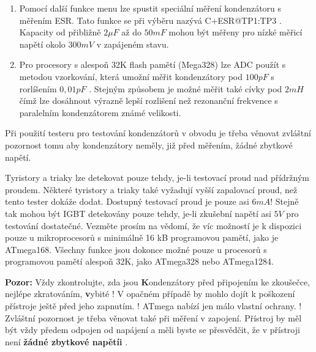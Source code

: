 \begin{enumerate}
\item Pomocí další funkce menu lze spustit speciální měření kondenzátoru s měřením ESR.
Tato funkce se při výběru nazývá \mbox{C+ESR@TP1:TP3} .
 Kapacity od přibližně \(2\mu F\) až do \(50mF\) mohou být měřeny pro nízké měřicí napětí okolo \(300mV\)
 v zapájeném stavu.
\item Pro procesory s alespoň 32K flash pamětí (Mega328) lze ADC použít s metodou vzorkování,
která umožní měřit kondenzátory pod \(100pF\) s rorlíšením  \(0,01pF\) .
Stejným způsobem je možné měřit také cívky pod \(2mH\) čímž lze dosáhnout výrazně lepší rozlišení
než rezonanční frekvence s paralelním kondenzátorem známé velikosti.
\end{enumerate}

 Při použití testeru pro testování kondenzátorů v obvodu je třeba věnovat zvláštní pozornost tomu
  aby kondenzátory neměly, již před měřením, žádné zbytkové napětí.

Tyristory a triaky lze detekovat pouze tehdy, je-li testovací proud nad přídržným proudem.
Některé tyristory a triaky také vyžadují vyšší zapalovací proud, než tento tester dokáže dodat.
Dostupný testovací proud je pouze asi \(6mA\)!
Stejně tak mohou být IGBT detekovány pouze tehdy, je-li zkušební napětí asi \(5V\) pro testování dostatečné.
Vezměte prosím na vědomí, že víc možností je k dispozici pouze u mikroprocesorů s minimálně 16 kB programovou pamětí,
jako je ATmega168. 
Všechny funkce jsou dokonce možné pouze u procesorů s programovou pamětí alespoň 32K, jako ATmega328 nebo ATmega1284.

\vspace{1cm}
{\textbf{\Large Pozor:}} Vždy zkontrolujte, zda jsou {\textbf Kondenzátory}  před připojením ke zkoušečce,
nejlépe zkratováním, {\textbf vybité} !
V opačném případě by mohlo dojít k poškození přístroje ještě před jeho zapnutím.
! ATmega nabízí jen málo vlastní ochrany. !
Zvláštní pozornost je třeba věnovat také při měření v zapojení.
Přístroj by měl být vždy předem odpojen od napájení a měli byste se přesvědčit,
že v přístroji není {\textbf {žádné zbytkové napětíi}} .
